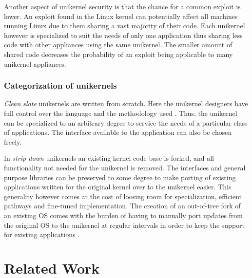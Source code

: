 \documentclass[10pt,twocolumn,a4paper]{article}
\begin{document}
      Another aspect of unikernel security is that the chance for a common exploit is lower.
      An exploit found in the Linux kernel can potentially affect all machines running Linux
      due to them sharing a vast majority of their code.
      Each unikernel however is specialized to suit the needs of only one application thus
      sharing less code with other appliances using the same unikernel.
      The smaller amount of shared code decreases the probability of an exploit being applicable
      to many unikernel appliances.

    \subsubsection{Categorization of unikernels}\label{sec:categories-of-unikernels}
      \textit{Clean slate} unikernels are written from scratch.
      Here the unikernel designers have full control over the language
      and the methodology used \cite{raza19}.
      Thus, the unikernel can be specialized to an arbitrary degree to service the needs
      of a particular class of applications.
      The interface available to the application can also be chosen freely.

      In \textit{strip down} unikernels an existing kernel code base is forked,
      and all functionality not needed for the unikernel is removed.
      The interfaces and general purpose libraries can be preserved to some degree
      to make porting of existing applications written for the original kernel
      over to the unikernel easier. 
      This generality however comes at the cost of loosing room for specialization,
      efficient pathways and fine-tuned implementation.
      The creation of an out-of-tree fork of an existing OS comes with the burden of
      having to manually port updates from the original OS to the unikernel at regular intervals
      in order to keep the support for existing applications \cite{raza19}.
      
\section{Related Work}\label{sec:relwork} 
\end{document}
